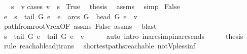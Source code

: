 \begin{isabellebody}
\ \ \ {\isachardoublequoteopen}s\ {\isasymrightarrow}\isactrlsup {\isacharasterisk}\ v{\isachardoublequoteclose}\isanewline
%
\isadelimproof
%
\endisadelimproof
%
\isatagproof
{}\isamarkupfalse%
{\isacharparenleft}cases\ {\isachardoublequoteopen}v\ {\isacharequal}\ s{\isachardoublequoteclose}{\isacharparenright}\isanewline
{}\isamarkupfalse%
\ True\ \isamarkupfalse%
\ {\isacharquery}thesis\ \isamarkupfalse%
\ assms\ \isamarkupfalse%
\ simp\isanewline
{}\isamarkupfalse%
\isanewline
{}\isamarkupfalse%
\ False\isanewline
\ \ \isamarkupfalse%
\ e\ \ {\isachardoublequoteopen}s\ {\isasymrightarrow}\isactrlsup {\isacharasterisk}\ tail\ G\ e{\isachardoublequoteclose}\ \ {\isachardoublequoteopen}e\ {\isasymin}\ arcs\ G{\isachardoublequoteclose}\ \ {\isachardoublequoteopen}head\ G\ e\ {\isacharequal}\ v{\isachardoublequoteclose}\isanewline
\ \ \ \ \ \ \isamarkupfalse%
\ path{\isacharunderscore}from{\isacharunderscore}root{\isacharunderscore}Vr{\isacharunderscore}ex{\isacharbrackleft}OF\ assms{\isacharparenleft}{}{\isacharparenright}\ False\ assms{\isacharparenleft}{}{\isacharparenright}{\isacharbrackright}\ \isamarkupfalse%
\ blast\isanewline
\ \ \isamarkupfalse%
\ \isamarkupfalse%
\ {\isachardoublequoteopen}s\ {\isasymrightarrow}\isactrlsup {\isacharasterisk}\ tail\ G\ e{\isachardoublequoteclose}\ \ {\isachardoublequoteopen}tail\ G\ e\ {\isasymrightarrow}\ v{\isachardoublequoteclose}\isanewline
\ \ \ \ \isamarkupfalse%
\ {\isacharparenleft}auto\ intro{\isacharcolon}\ in{\isacharunderscore}arcs{\isacharunderscore}imp{\isacharunderscore}in{\isacharunderscore}arcs{\isacharunderscore}ends{\isacharparenright}\isanewline
\ \ \isamarkupfalse%
\ \isamarkupfalse%
\ {\isacharquery}thesis\ \isamarkupfalse%
\ {\isacharparenleft}rule\ reachable{\isacharunderscore}adj{\isacharunderscore}trans{\isacharparenright}\isanewline
{}\isamarkupfalse%
%
\endisatagproof
{\isafoldproof}%
%
\isadelimproof
\isanewline
%
\endisadelimproof
\isanewline
\isanewline
{}\isamarkupfalse%
\ {\isacharparenleft}\ shortest{\isacharunderscore}paths{\isacharunderscore}reachable{\isacharparenright}\ not{\isacharunderscore}Vp{\isacharunderscore}{\isasymmu}{\isacharunderscore}less{\isacharunderscore}inf{\isacharcolon}\isanewline

\end{isabellebody}
